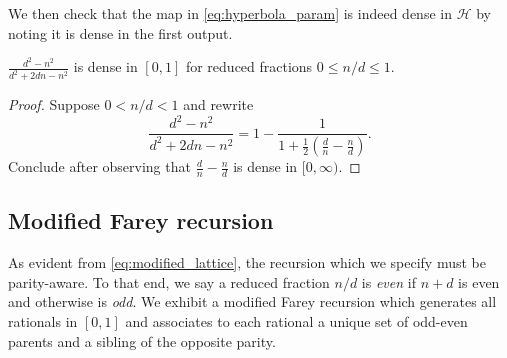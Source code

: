 \documentclass[12pt]{amsart}
\begin{document}
We then check that the map in \eqref{eq:hyperbola_param} is indeed dense in $\mathcal{H}$
by noting it is dense in the first output. 
\begin{lemma}
	 $\frac{d^2-n^2}{d^2 +2 d n - n^2}$ is dense in $[0,1]$ for reduced fractions $0 \leq 	n/d \leq 1$.
\end{lemma}
\begin{proof}
	Suppose $0 < n/d < 1$ and rewrite
	\[
	\frac{d^2-n^2}{d^2 +2 d n - n^2} = 1 - \frac{1}{1 + \frac{1}{2}(\frac{d}{n} - \frac{n}{d})}.
	\]
	Conclude after observing that $\frac{d}{n} - \frac{n}{d}$ is dense in $[0,\infty)$. 
\end{proof}


\subsection{Modified Farey recursion} \label{subsec:modified_farey_recursion}
As evident from \eqref{eq:modified_lattice}, the recursion which we specify must be parity-aware. To that end, 
we say a reduced fraction $n/d$ is {\it even} if $n + d$ is even and otherwise is {\it odd}. We exhibit a modified Farey recursion which generates all rationals in $[0,1]$ and associates to each rational a unique set of odd-even parents and a sibling of the opposite parity. 
\end{document}
